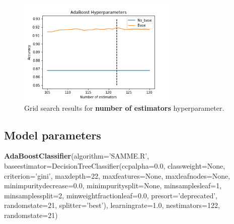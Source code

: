 \documentclass[11pt, letterpaper]{article}
\begin{document}
\begin{figure}[h]
\begin{center}
\includegraphics[width=3in]{ABHyperparameters.png}
\caption{Grid search results for \textbf{number of estimators} hyperparameter.} 
\label{fig:ABHyper}
\end{center}
\end{figure}

\subsection{Model parameters}
\noindent \textbf{AdaBoostClassifier}(algorithm='SAMME.R',
                   base\textunderscore estimator=DecisionTreeClassifier(ccp\textunderscore alpha=0.0,
                                                         class\textunderscore weight=None,
                                                         criterion='gini',
                                                         max\textunderscore depth=22,
                                                         max\textunderscore features=None,
                                                         max\textunderscore leaf\textunderscore nodes=None,
                                                         min\textunderscore impurity\textunderscore decrease=0.0,
                                                         min\textunderscore impurity\textunderscore split=None,
                                                         min\textunderscore samples\textunderscore leaf=1,
                                                         min\textunderscore samples\textunderscore split=2,
                                                         min\textunderscore weight\textunderscore fraction\textunderscore leaf=0.0,
                                                         presort='deprecated',
                                                         random\textunderscore state=21,
                                                         splitter='best'),
                   learning\textunderscore rate=1.0, n\textunderscore estimators=122, random\textunderscore state=21)
\end{document}

